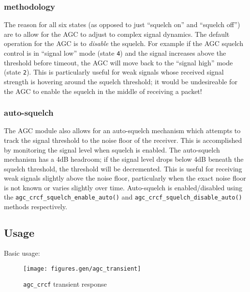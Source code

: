 \subsubsection{methodology}
The reason for all six states (as opposed to just ``squelch on'' and ``squelch
off'') are to allow for the AGC to adjust to complex signal dynamics.
The default operation for the AGC is to {\it disable} the squelch.
For example if the AGC squelch control is in ``signal low'' mode
(state {\tt 4}) and the signal increases above the threshold before timeout,
the AGC will move back to the ``signal high'' mode (state {\tt 2}).
This is particularly useful for weak signals whose received signal strength is
hovering around the squelch threshold; it would be undesireable for the AGC to
enable the squelch in the middle of receiving a packet!

\subsubsection{auto-squelch}
The AGC module also allows for an auto-squelch mechanism which attempts to
track the signal threshold to the noise floor of the receiver.
This is accomplished by monitoring the signal level when squelch is enabled.
The auto-squelch mechanism has a 4dB headroom; if the signal level drops below
4dB beneath the squelch threshold, the threshold will be decremented.
This is useful for receiving weak signals slightly above the noise floor,
particularly when the exact noise floor is not known or varies slightly over
time.
Auto-squelch is enabled/disabled using the
{\tt agc\_crcf\_squelch\_enable\_auto()} and 
{\tt agc\_crcf\_squelch\_disable\_auto()} methods respectively.

\subsection{Usage}
Basic usage:


\begin{figure}
\centering
  \texttt{[image: figures.gen/agc\_transient]}
\caption{{\tt agc\_crcf} transient response}
\label{fig:module:agc:transient}
\end{figure}


